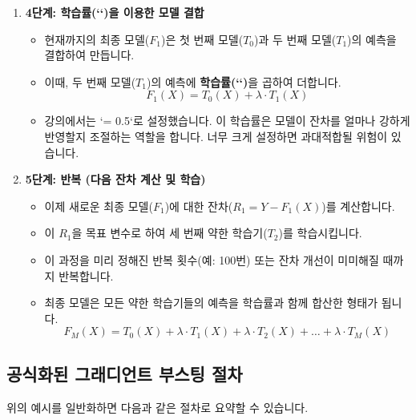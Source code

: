 \documentclass[11pt,a4paper]{article}
\begin{document}
\begin{examplebox}[회귀 문제 예시]
\begin{enumerate}
    \item \textbf{4단계: 학습률(`\lambda`)을 이용한 모델 결합}
    \begin{itemize}
        \item 현재까지의 최종 모델($F_1$)은 첫 번째 모델($T_0$)과 두 번째 모델($T_1$)의 예측을 결합하여 만듭니다.
        \item 이때, 두 번째 모델($T_1$)의 예측에 \textbf{학습률(`\lambda`)}을 곱하여 더합니다.
        \[ F_1(X) = T_0(X) + \lambda \cdot T_1(X) \]
        \item 강의에서는 `\lambda = 0.5`로 설정했습니다. 이 학습률은 모델이 잔차를 얼마나 강하게 반영할지 조절하는 역할을 합니다. 너무 크게 설정하면 과대적합될 위험이 있습니다.
    \end{itemize}

    \item \textbf{5단계: 반복 (다음 잔차 계산 및 학습)}
    \begin{itemize}
        \item 이제 새로운 최종 모델($F_1$)에 대한 잔차($R_1 = Y - F_1(X)$)를 계산합니다.
        \item 이 $R_1$을 목표 변수로 하여 세 번째 약한 학습기($T_2$)를 학습시킵니다.
        \item 이 과정을 미리 정해진 반복 횟수(예: 100번) 또는 잔차 개선이 미미해질 때까지 반복합니다.
        \item 최종 모델은 모든 약한 학습기들의 예측을 학습률과 함께 합산한 형태가 됩니다.
        \[ F_M(X) = T_0(X) + \lambda \cdot T_1(X) + \lambda \cdot T_2(X) + \dots + \lambda \cdot T_M(X) \]
    \end{itemize}
\end{enumerate}
\end{examplebox}

\subsection{공식화된 그래디언트 부스팅 절차}
위의 예시를 일반화하면 다음과 같은 절차로 요약할 수 있습니다.
\end{document}

